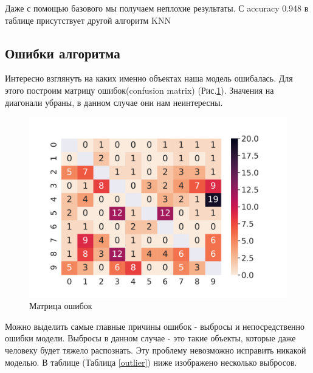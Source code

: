 \documentclass[12pt,fleqn]{article}
\begin{document}
Даже с помощью базового мы получаем неплохие результаты. С accuracy 0.948 в таблице присутствует другой
алгоритм KNN \cite{deformationmodels}


\subsection{Ошибки алгоритма}

Интересно взглянуть на каких именно объектах наша модель ошибалась. Для этого построим 
матрицу ошибок(confusion matrix) (Рис.\ref{pic3}). Значения на диагонали убраны, в данном случае они нам неинтересны.

\begin{figure}[htb]
    \centering
    \includegraphics[width=12cm]{task4.pdf}
    \caption{Матрица ошибок}
    \label{pic3}
\end{figure}

Можно выделить самые главные причины ошибок - выбросы и непосредственно ошибки модели. Выбросы в данном случае - это такие объекты, 
которые даже человеку будет тяжело распознать. Эту проблему невозможно исправить никакой моделью. В таблице (Таблица \ref{outlier}) ниже
изображено несколько выбросов.
\end{document}
